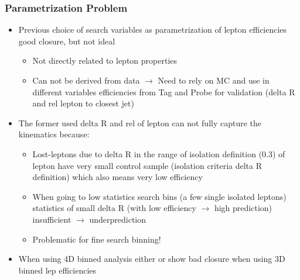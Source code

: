 \documentclass{beamer}
\begin{document}
\begin{frame}
 \frametitle{Parametrization Problem}
 \begin{itemize}
  \item Previous choice of search variables as parametrization of lepton efficiencies good closure, but not ideal
  \begin{itemize}
   \item Not directly related to lepton properties
   \item Can not be derived from data $\rightarrow$ Need to rely on MC and use in different variables efficiencies from Tag and Probe for validation (delta R and rel \pt lepton to closest jet)
  \end{itemize}
  \item The former used delta R and rel \pt of lepton can not fully capture the kinematics because:
  \begin{itemize}
   \item Lost-leptons due to delta R in the range of isolation definition (0.3) of lepton have very small control sample (isolation criteria delta R \pt definition) which also means very low efficiency
   \item When going to low statistics search bins (a few single isolated leptons) statistics of small delta R (with low efficiency $\rightarrow$ high prediction) insufficient $\rightarrow$ underprediction
   \item Problematic for fine search binning!
  \end{itemize}
  \item When using 4D binned analysis either \BTags or \NJets show bad closure when using 3D binned lep efficiencies
 \end{itemize}
\end{frame}
\end{document}

